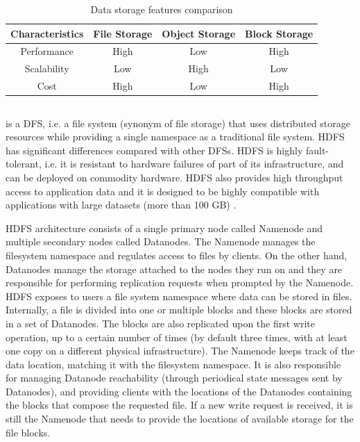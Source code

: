 \begin{table}[!ht]
    \begin{center}
      \caption{Data storage features comparison}
      \label{tab:storagecomparison}
      \begin{tabular}{cccc} %
        \toprule
        \textbf{Characteristics}\Tstrut\Bstrut & \textbf{File Storage} & \textbf{Object Storage} & \textbf{Block Storage}\\
        \midrule
        Performance & High & Low & High\Tstrut\\
        Scalability & Low & High & Low\\
        Cost & High & Low & High\Bstrut\\
        \bottomrule
      \end{tabular}
    \end{center}
\end{table}

\subsection{}

 is a \gls{DFS}, i.e. a file system (synonym of file storage) that uses distributed storage resources while providing a single namespace as a traditional file system. \gls{HDFS} has significant differences compared with other \glspl{DFS}. \gls{HDFS} is highly fault-tolerant, i.e. it is resistant to hardware failures of part of its infrastructure, and can be deployed on commodity hardware. \gls{HDFS} also provides high throughput access to application data and it is designed to be highly compatible with applications with large datasets (more than 100 GB) \cite{borthakurHadoopDistributedFile2005}. 

\gls{HDFS} architecture consists of a single primary node called Namenode and multiple secondary nodes called Datanodes. The Namenode manages the filesystem namespace and regulates access to files by clients. On the other hand, Datanodes manage the storage attached to the nodes they run on and they are responsible for performing replication requests when prompted by the Namenode. \gls{HDFS} exposes to users a file system namespace where data can be stored in files. Internally, a file is divided into one or multiple blocks and these blocks are stored in a set of Datanodes. The blocks are also replicated upon the first write operation, up to a certain number of times (by default three times, with at least one copy on a different physical infrastructure). The Namenode keeps track of the data location, matching it with the filesystem namespace. It is also responsible for managing Datanode reachability (through periodical state messages sent by Datanodes), and providing clients with the locations of the Datanodes containing the blocks that compose the requested file. If a new write request is received, it is still the Namenode that needs to provide the locations of available storage for the file blocks. 

